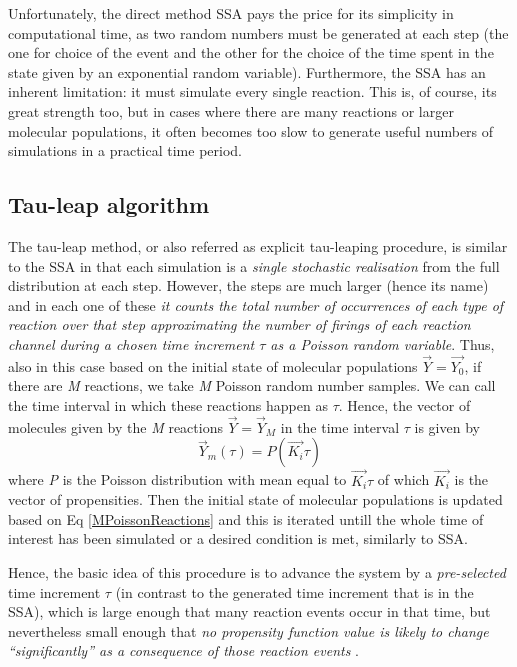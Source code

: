 \documentclass[12pt,a4paper]{report}
\begin{document}
Unfortunately, the direct method SSA pays the price for its simplicity in computational time, as two random numbers must be generated at each step \cite{Article} (the one for choice of the event and the other for the choice of the time spent in the state given by an exponential random variable). Furthermore, the SSA has an inherent limitation: it must simulate every single reaction. This is, of course, its great strength too, but in cases where there are many reactions or larger molecular populations, it often becomes too slow to generate useful numbers of simulations in a practical time period.

\subsection{Tau-leap algorithm}
The tau-leap method, or also referred as explicit tau-leaping procedure, is similar to the SSA in that each simulation is a \emph{single stochastic realisation} from the full distribution at each step. However, the steps are much larger (hence its name) \cite{Article} and in each one of these \emph{it counts the total number of occurrences of each type of reaction over that step approximating the number of firings of each reaction channel during a chosen time increment $\tau$ as a Poisson random variable}. Thus, also in this case based on the initial state of molecular populations $\Vec{Y}=\Vec{Y_{0}}$, if there are \emph{M} reactions, we take \emph{M} Poisson random number samples. We can call the time interval in which these reactions happen as $\tau$. Hence, the vector of molecules given by the \emph{M} reactions $\Vec{Y}=\Vec{Y}_{M}$ in the time interval $\tau$ is given by
\begin{equation}\label{MPoissonReactions}
    \Vec{Y}_{m}(\tau) = P(\Vec{K_{i}}\tau)
\end{equation}
where \emph{P} is the Poisson distribution with mean equal to $\Vec{K_{i}}\tau$ of which $\Vec{K_{i}}$ is the vector of propensities. Then the initial state of molecular populations is updated based on Eq \ref{MPoissonReactions}  and this is iterated untill the whole time of interest has been simulated or a desired condition is met, similarly to SSA.


Hence, the basic idea of this procedure is to advance the system by a \emph{pre-selected} time increment $\tau$ (in contrast to the generated time increment that is in the SSA), which is large enough that many reaction events occur in that time, but nevertheless small enough that \emph{no propensity function value is likely to change ``significantly'' as a consequence of those reaction events} \cite{Method}.
\end{document}
